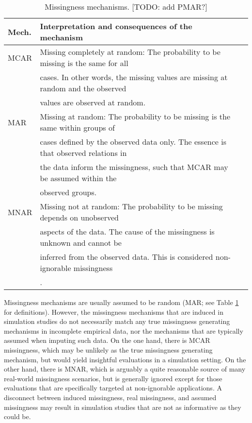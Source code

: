 \documentclass[bimj,fleqn]{w-art}
\begin{document}
\begin{table}[tb]
\begin{center}
\caption{Missingness mechanisms. [TODO: add PMAR?]}
\label{table:mech}
\begin{tabular}{lll}
\hline
Mech. & Interpretation and consequences of the mechanism \\
\hline  
MCAR  & Missing completely at random: The probability to be missing is the same for all \\
      & cases. In other words, the missing values are missing at random and the observed \\
      & values are observed at random. \\
MAR   & Missing at random: The probability to be missing is the same within groups of \\
      & cases defined by the observed data only. The essence is that observed relations in \\
      & the data inform the missingness, such that MCAR may be assumed within the \\ 
      & observed groups. \\
MNAR  & Missing not at random: The probability to be missing depends on unobserved \\
      & aspects of the data. The cause of the missingness is unknown and cannot be \\ 
      & inferred from the observed data. This is considered non-ignorable missingness \\
      & \citep[see e.g.][]{rubi76}. \\
\hline
\end{tabular}
\end{center}
\end{table}

Missingness mechanisms are usually assumed to be random (MAR; see Table \ref{table:mech} for definitions). However, the missingness mechanisms that are induced in simulation studies do not necessarily match any true missingness generating mechanisms in incomplete empirical data, nor the mechanisms that are typically assumed when imputing such data. On the one hand, there is MCAR missingness, which may be unlikely as the true missingness generating mechanism, but would yield insightful evaluations in a simulation setting. On the other hand, there is MNAR, which is arguably a quite reasonable source of many real-world missingness scenarios, but is generally ignored except for those evaluations that are specifically targeted at non-ignorable applications. A disconnect between induced missingness, real missingness, and assumed missingness may result in simulation studies that are not as informative as they could be. 
\end{document}
